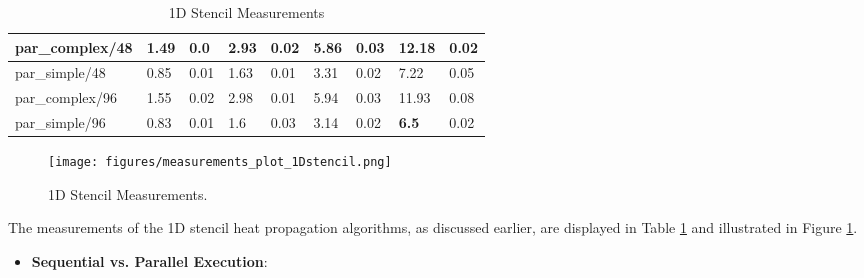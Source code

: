 \documentclass[UTF-8]{article}
\begin{document}
\begin{itemize}
\begin{table}[H]
\begin{tabular}{|lllllllll|}
            \multicolumn{1}{|l|}{par\_complex/48} &
              \multicolumn{1}{l|}{1.49} &
              \multicolumn{1}{l|}{0.0} &
              \multicolumn{1}{l|}{2.93} &
              \multicolumn{1}{l|}{0.02} &
              \multicolumn{1}{l|}{5.86} &
              \multicolumn{1}{l|}{0.03} &
              \multicolumn{1}{l|}{12.18} &
              0.02 \\ \hline
            \multicolumn{1}{|l|}{par\_simple/48} &
              \multicolumn{1}{l|}{0.85} &
              \multicolumn{1}{l|}{0.01} &
              \multicolumn{1}{l|}{1.63} &
              \multicolumn{1}{l|}{0.01} &
              \multicolumn{1}{l|}{3.31} &
              \multicolumn{1}{l|}{0.02} &
              \multicolumn{1}{l|}{7.22} &
              0.05 \\ \hline
            \multicolumn{1}{|l|}{par\_complex/96} &
              \multicolumn{1}{l|}{1.55} &
              \multicolumn{1}{l|}{0.02} &
              \multicolumn{1}{l|}{2.98} &
              \multicolumn{1}{l|}{0.01} &
              \multicolumn{1}{l|}{5.94} &
              \multicolumn{1}{l|}{0.03} &
              \multicolumn{1}{l|}{11.93} &
              0.08 \\ \hline
            \multicolumn{1}{|l|}{par\_simple/96} &
              \multicolumn{1}{l|}{0.83} &
              \multicolumn{1}{l|}{0.01} &
              \multicolumn{1}{l|}{1.6} &
              \multicolumn{1}{l|}{0.03} &
              \multicolumn{1}{l|}{3.14} &
              \multicolumn{1}{l|}{0.02} &
              \multicolumn{1}{l|}{\textbf{6.5}} &
              0.02 \\ \hline
            \end{tabular}
            \caption{1D Stencil Measurements}
            \label{table:measurement_1dstencil}
            \end{table}
            \begin{figure}[H]
                \centering
                \texttt{[image: figures/measurements\_plot\_1Dstencil.png]}
                \caption{1D Stencil Measurements.}
                \label{fig:measurement_1dstencil}
            \end{figure}
            The measurements of the 1D stencil heat propagation algorithms, as discussed earlier, are displayed in Table \ref{table:measurement_1dstencil} and illustrated in Figure \ref{fig:measurement_1dstencil}.\\
            \begin{itemize}
                \item \textbf{Sequential vs. Parallel Execution}:\\

\end{itemize}
\end{itemize}
\end{document}
